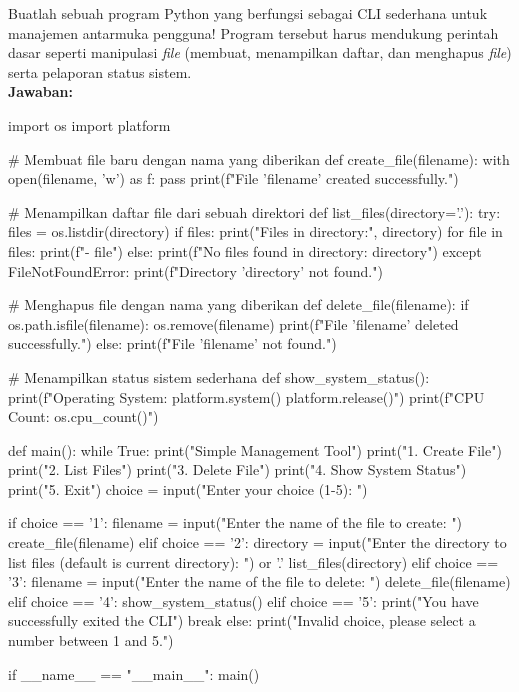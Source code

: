 \documentclass[12pt]{article}
\begin{document}
Buatlah sebuah program Python yang berfungsi sebagai CLI sederhana untuk manajemen antarmuka pengguna! Program tersebut harus mendukung perintah dasar seperti manipulasi \textit{file} (membuat, menampilkan daftar, dan menghapus \textit{file}) serta pelaporan status sistem. \\

\noindent \textbf{Jawaban: }
\begin{python}
import os
import platform

# Membuat file baru dengan nama yang diberikan
def create_file(filename):
    with open(filename, 'w') as f:
        pass
    print(f"File '{filename}' created successfully.")

# Menampilkan daftar file dari sebuah direktori
def list_files(directory='.'):
    try:
        files = os.listdir(directory)
        if files:
            print("Files in directory:", directory)
            for file in files:
                print(f"- {file}")
        else:
            print(f"No files found in directory: {directory}")
    except FileNotFoundError:
        print(f"Directory '{directory}' not found.")

# Menghapus file dengan nama yang diberikan
def delete_file(filename):
    if os.path.isfile(filename):
        os.remove(filename)
        print(f"File '{filename}' deleted successfully.")
    else:
        print(f"File '{filename}' not found.")

# Menampilkan status sistem sederhana
def show_system_status():
    print(f"Operating System: {platform.system()} {platform.release()}")
    print(f"CPU Count: {os.cpu_count()}")

def main():
    while True:
        print("\nCLI Simple Management Tool")
        print("1. Create File")
        print("2. List Files")
        print("3. Delete File")
        print("4. Show System Status")
        print("5. Exit")
        choice = input("Enter your choice (1-5): ")

        if choice == '1':
            filename = input("Enter the name of the file to create: ")
            create_file(filename)
        elif choice == '2':
            directory = input("Enter the directory to list files (default is current directory): ") or '.'
            list_files(directory)
        elif choice == '3':
            filename = input("Enter the name of the file to delete: ")
            delete_file(filename)
        elif choice == '4':
            show_system_status()
        elif choice == '5':
            print("You have successfully exited the CLI")
            break
        else:
            print("Invalid choice, please select a number between 1 and 5.")

if __name__ == "__main__":
    main()
\end{python}
\end{document}
